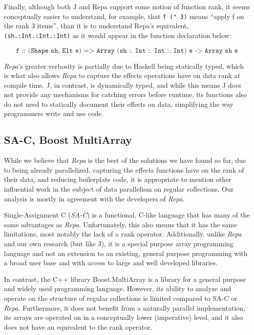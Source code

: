 Finally, although both J and Repa support some notion of function rank, 
it seems conceptually easier to understand, for example, 
that \texttt{f (" 3)} means ``apply f on the rank 3 items'', than it is to understand Repa's equivalent, 
\texttt{(sh.:Int.:Int.:Int)} as it would appear in the function declaration below: 

\[\texttt{f :: (Shape sh, Elt e) => Array (sh :. Int :. Int :. Int) e -> Array sh e} \]

\noindent \textit{Repa}'s greater verbosity is partially due to Haskell being statically typed, 
which is what also allows \textit{Repa} to capture the effects operations have on data rank at compile time. 
J, in contrast, is dynamically typed, and while this means J does not provide any mechanisms for catching errors before runtime, 
its functions also do not need to statically document their effects on data, simplifying the way programmers write and use code.

\subsection{SA-C, Boost MultiArray}
While we believe that \textit{Repa} is the best of the solutions we have found so far, 
due to being already parallelized, capturing the effects functions have on the rank of their data, 
and reducing boilerplate code, 
it is appropriate to mention other influential work in the subject of data parallelism on regular collections.
Our analysis is mostly in agreement with the developers of \textit{Repa}\cite{dph}.

Single-Assignment C (\textit{SA-C}) is a functional, C-like language 
that has many of the same advantages as \textit{Repa}\cite{dph}\cite{sac}.
Unfortunately, this also means that it has the same limitations, most notably the lack of a rank operator.
Additionally, unlike \textit{Repa} and our own research (but like J), 
it is a special purpose array programming language and 
not an extension to an existing, general purpose programming with a broad user base and 
with access to large and well developed libraries.

In contrast, the C++ library Boost.MultiArray is a library for a general purpose and widely used programming language\cite{boost}.
However, its ability to analyze and operate on the structure of regular collections is limited compared to SA-C or \textit{Repa}.
Furthermore, it does not benefit from a naturally parallel implementation, 
its arrays are operated on in a conceptually lower (imperative) level, 
and it also does not have an equivalent to the rank operator. 
